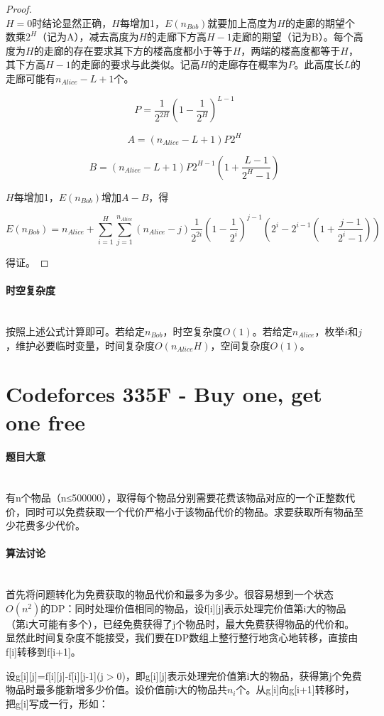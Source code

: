 \documentclass[UTF8]{ctexart}
\newcommand{\myparagraph}[1]{\paragraph{#1}\mbox{}\\}
\theoremstyle{nonumberplain}
\newtheorem{proof}{\hspace{1em}证明：}
\begin{document}
			\begin{proof}\mbox{}\\
			
				$H=0$时结论显然正确，$H$每增加1，$E(n_{Bob})$就要加上高度为$H$的走廊的期望个数乘$2^H$（记为A），减去高度为$H$的走廊下方高$H-1$走廊的期望（记为B）。每个高度为$H$的走廊的存在要求其下方的楼高度都小于等于$H$，两端的楼高度都等于$H$，其下方高$H-1$的走廊的要求与此类似。记高$H$的走廊存在概率为$P$。此高度长$L$的走廊可能有$n_{Alice}-L+1$个。
				
				$$P=\frac{1}{2^{2H}}(1-\frac{1}{2^H})^{L-1}$$
				
				$$A=(n_{Alice}-L+1)P2^H$$
				
				$$B=(n_{Alice}-L+1)P2^{H-1}(1+\frac{L-1}{2^H-1})$$
				
				$H$每增加1，$E(n_{Bob})$增加$A-B$，得
				
				$$E(n_{Bob})=n_{Alice}+\sum_{i=1}^{H}\sum_{j=1}^{n_{Alice}}(n_{Alice}-j)\frac{1}{2^{2i}}(1-\frac{1}{2^i})^{j-1}(2^i-2^{i-1}(1+\frac{j-1}{2^i-1}))$$
				
				得证。
			
			\end{proof}
			
		\myparagraph{时空复杂度}
		
			按照上述公式计算即可。若给定$n_{Bob}$，时空复杂度$O(1)$。若给定$n_{Alice}$，枚举$i$和$j$，维护必要临时变量，时间复杂度$O(n_{Alice}H)$，空间复杂度$O(1)$。
	
	\section{Codeforces 335F - Buy one, get one free}
	
		\myparagraph{题目大意}
			
			有n个物品（n≤500000），取得每个物品分别需要花费该物品对应的一个正整数代价，同时可以免费获取一个代价严格小于该物品代价的物品。求要获取所有物品至少花费多少代价。
			
		\myparagraph{算法讨论}
		
			首先将问题转化为免费获取的物品代价和最多为多少。很容易想到一个状态$O(n^2)$的DP：同时处理价值相同的物品，设f[i][j]表示处理完价值第i大的物品（第i大可能有多个），已经免费获得了j个物品时，最大免费获得物品的代价和。显然此时间复杂度不能接受，我们要在DP数组上整行整行地贪心地转移，直接由f[i]转移到f[i+1]。
			
			设g[i][j]=f[i][j]-f[i][j-1](j$>$0)，即g[i][j]表示处理完价值第i大的物品，获得第j个免费物品时最多能新增多少价值。设价值前i大的物品共$n_i$个。从g[i]向g[i+1]转移时，把g[i]写成一行，形如：
			
\end{document}
